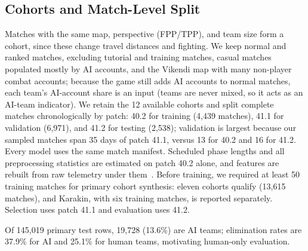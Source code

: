 \documentclass[sigconf,anonymous,nonacm]{acmart}
\begin{document}
\subsection{Cohorts and Match-Level Split}
\label{sec:method:cohort}
Matches with the same map, perspective (FPP/TPP), and team size form a cohort, since these change travel distances and fighting.
We keep normal and ranked matches, excluding tutorial and training matches, casual matches populated mostly by AI accounts, and the Vikendi map with many non-player combat accounts; because the game still adds AI accounts to normal matches, each team's AI-account share is an input (teams are never mixed, so it acts as an AI-team indicator).
We retain the 12 available cohorts and split complete matches chronologically by patch: 40.2 for training (4,439 matches), 41.1 for validation (6,971), and 41.2 for testing (2,538); validation is largest because our sampled matches span 35 days of patch 41.1, versus 13 for 40.2 and 16 for 41.2. Every model uses the same match manifest. Scheduled phase lengths and all preprocessing statistics are estimated on patch 40.2 alone, and features are rebuilt from raw telemetry under them~\cite{Kaufman12}. Before training, we required at least 50 training matches for primary cohort synthesis: eleven cohorts qualify (13,615 matches), and Karakin, with six training matches, is reported separately. Selection uses patch 41.1 and evaluation uses 41.2.

Of 145,019 primary test rows, 19,728 (13.6\%) are AI teams; elimination rates are 37.9\% for AI and 25.1\% for human teams, motivating human-only evaluation.
\end{document}
